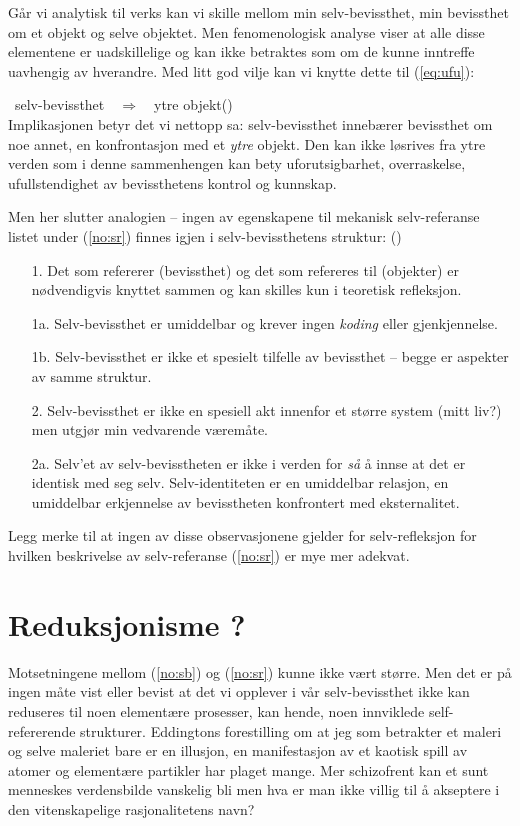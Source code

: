\documentclass[10pt,twocolumn,leqno]{article}
\newcounter{EQ}
\newcommand{\equ}[1]{\refstepcounter{EQ}\vspace{.5ex}\par\noindent\ 
    \hfill #1\hfill{(\theEQ)}\\[.5ex]}
\newcommand{\refp}[1]{(\ref{#1})}
\newcommand{\<}{\langle}
\renewcommand{\>}{\rangle}
\newcommand{\MyLPar}{\parsep -.2ex plus.2ex minus.2ex\itemsep\parsep
   \vspace{-\topsep}\vspace{.5ex}}
\begin{document}
G{\aa}r vi analytisk til verks kan vi skille mellom min 
selv-bevissthet, min
bevissthet om et objekt og selve objektet. Men fenomenologisk analyse viser 
at alle disse elementene er uadskillelige
og kan ikke betraktes som om de kunne inntreffe uavhengig av 
hverandre. 
%
Med litt god vilje kan vi knytte dette til \refp{eq:ufu}: 
\equ{selv-bevissthet\ \ $\Rightarrow$\ \ ytre objekt}
%
Implikasjonen betyr det vi nettopp sa: selv-be\-visst\-het inneb{\ae}rer bevissthet
om noe annet, en 
konfrontasjon med et {\em ytre} objekt. Den kan ikke
l{\o}s\-ri\-ves fra ytre verden som i denne
sammenhengen kan bety uforutsigbarhet, overraskelse, ufullstendighet
av bevissthetens kontrol og kunnskap.

Men her slutter analogien -- ingen av egenskapene
til mekanisk selv-referanse listet under \refp{no:sr} finnes igjen i 
selv-bevissthetens struktur: 
\hfill{(\theEQ)\label{no:sb}}
\begin{itemize}\MyLPar
\item[1.] Det som refererer (bevissthet) og det som refereres til 
(objekter) er n{\o}dvendigvis knyttet sammen og kan skilles kun i teoretisk 
refleksjon.
\item[1a.] Selv-bevissthet er umiddelbar og krever ingen {\em koding} 
eller gjenkjennelse.
\item[1b.] Selv-bevissthet er ikke et spesielt tilfelle av bevissthet 
 -- begge er aspekter av samme struktur.
\item[2.] Selv-bevissthet er ikke en spesiell akt innenfor et st{\o}rre 
system (mitt liv?) men utgj{\o}r min vedvarende v{\ae}rem{\aa}te.
\item[2a.] Selv'et av selv-bevisstheten er ikke i verden for {\em s{\aa}} {\aa} 
innse 
at det er identisk med seg selv. Selv-identiteten er en umiddelbar 
relasjon, en umiddelbar erkjennelse av bevisstheten konfrontert med 
eksternalitet.
\end{itemize}
Legg merke til at ingen av disse observasjonene gjelder for selv-refleksjon 
for hvilken beskrivelse av selv-referanse \refp{no:sr} 
er mye mer adekvat.

\section{Reduksjonisme ?}
Motsetningene mellom \refp{no:sb} og \refp{no:sr} kunne ikke v{\ae}rt st{\o}rre.
Men det er p{\aa} ingen m{\aa}te vist eller
bevist at det vi opplever i v{\aa}r selv-bevissthet ikke 
kan reduseres til noen element{\ae}re 
prosesser, kan hende, noen innviklede self-refererende strukturer.
Eddingtons forestilling om at jeg som betrakter et maleri og selve maleriet
bare er en illusjon, en manifestasjon av et kaotisk spill av atomer og 
element{\ae}re partikler har plaget mange. Mer 
schizofrent kan et sunt menneskes verdensbilde vanskelig bli men hva er 
man ikke villig til {\aa} akseptere i den vitenskapelige rasjonalitetens navn?
\end{document}
